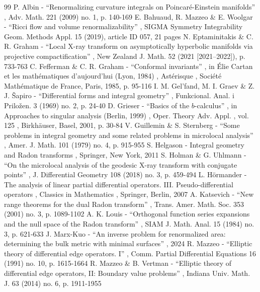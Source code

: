 \documentclass[11pt]{article}
\theoremstyle{plain}
\theoremstyle{definition}
\theoremstyle{remark}
\begin{document}

\begin{thebibliography}{99}
 P. Albin - “Renormalizing curvature integrals on Poincaré-Einstein manifolds” , Adv. Math. 221 (2009) no. 1, p. 140-169
 E. Bahuaud, R. Mazzeo \& E. Woolgar - “Ricci flow and volume renormalizability” , SIGMA Symmetry Integrability Geom. Methods Appl. 15 (2019), article ID 057, 21 pages
 N. Eptaminitakis \& C. R. Graham - “Local X-ray transform on asymptotically hyperbolic manifolds via projective compactification” , New Zealand J. Math. 52 (2021 [2021–2022]), p. 733-763
 C. Fefferman \& C. R. Graham - “Conformal invariants” , in Élie Cartan et les mathématiques d’aujourd’hui (Lyon, 1984) , Astérisque , Société Mathématique de France, Paris, 1985, p. 95-116
 I. M. Gel’fand, M. I. Graev \& Z. J. Šapiro - “Differential forms and integral geometry” , Funkcional. Anal. i Priložen. 3 (1969) no. 2, p. 24-40
 D. Grieser - “Basics of the $b$-calculus” , in Approaches to singular analysis (Berlin, 1999) , Oper. Theory Adv. Appl. , vol. 125 , Birkhäuser, Basel, 2001, p. 30-84
 V. Guillemin \& S. Sternberg - “Some problems in integral geometry and some related problems in microlocal analysis” , Amer. J. Math. 101 (1979) no. 4, p. 915-955
 S. Helgason - Integral geometry and Radon transforms , Springer, New York, 2011
 S. Holman \& G. Uhlmann - “On the microlocal analysis of the geodesic X-ray transform with conjugate points” , J. Differential Geometry 108 (2018) no. 3, p. 459-494
 L. Hörmander - The analysis of linear partial differential operators. III. Pseudo-differential operators , Classics in Mathematics , Springer, Berlin, 2007
 A. Katsevich - “New range theorems for the dual Radon transform” , Trans. Amer. Math. Soc. 353 (2001) no. 3, p. 1089-1102
 A. K. Louis - “Orthogonal function series expansions and the null space of the Radon transform” , SIAM J. Math. Anal. 15 (1984) no. 3, p. 621-633
 J. Marx-Kuo - “An inverse problem for renormalized area: determining the bulk metric with minimal surfaces” , 2024
 R. Mazzeo - “Elliptic theory of differential edge operators. I” , Comm. Partial Differential Equations 16 (1991) no. 10, p. 1615-1664
 R. Mazzeo \& B. Vertman - “Elliptic theory of differential edge operators, II: Boundary value problems” , Indiana Univ. Math. J. 63 (2014) no. 6, p. 1911-1955

\end{thebibliography}
\end{document}
